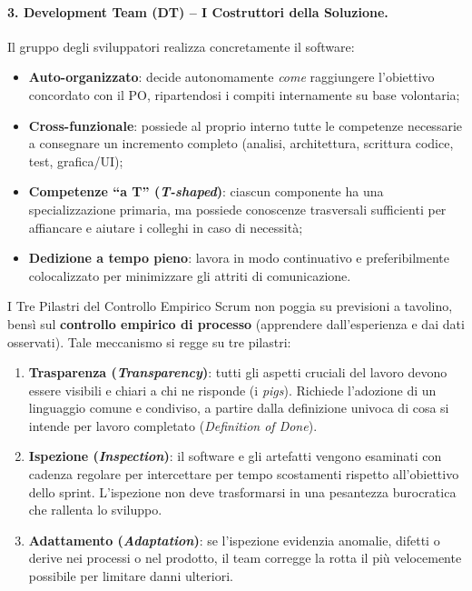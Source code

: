 \documentclass[12pt]{extarticle}
\begin{document}
\paragraph{3. Development Team (DT) -- I Costruttori della Soluzione.}
Il gruppo degli sviluppatori realizza concretamente il software:
\begin{itemize}
    \item \textbf{Auto-organizzato}: decide autonomamente \textit{come} raggiungere l'obiettivo concordato con il PO, ripartendosi i compiti internamente su base volontaria;
    \item \textbf{Cross-funzionale}: possiede al proprio interno tutte le competenze necessarie a consegnare un incremento completo (analisi, architettura, scrittura codice, test, grafica/UI);
    \item \textbf{Competenze ``a T'' (\textit{T-shaped})}: ciascun componente ha una specializzazione primaria, ma possiede conoscenze trasversali sufficienti per affiancare e aiutare i colleghi in caso di necessità;
    \item \textbf{Dedizione a tempo pieno}: lavora in modo continuativo e preferibilmente colocalizzato per minimizzare gli attriti di comunicazione.
\end{itemize}

\begin{cbox}{I Tre Pilastri del Controllo Empirico}
\noindent Scrum non poggia su previsioni a tavolino, bensì sul \textbf{controllo empirico di processo} (apprendere dall'esperienza e dai dati osservati). Tale meccanismo si regge su tre pilastri:
\begin{enumerate}
    \item \textbf{Trasparenza (\textit{Transparency})}: tutti gli aspetti cruciali del lavoro devono essere visibili e chiari a chi ne risponde (i \textit{pigs}). Richiede l'adozione di un linguaggio comune e condiviso, a partire dalla definizione univoca di cosa si intende per lavoro completato (\textit{Definition of Done}).
    \item \textbf{Ispezione (\textit{Inspection})}: il software e gli artefatti vengono esaminati con cadenza regolare per intercettare per tempo scostamenti rispetto all'obiettivo dello sprint. L'ispezione non deve trasformarsi in una pesantezza burocratica che rallenta lo sviluppo.
    \item \textbf{Adattamento (\textit{Adaptation})}: se l'ispezione evidenzia anomalie, difetti o derive nei processi o nel prodotto, il team corregge la rotta il più velocemente possibile per limitare danni ulteriori.
\end{enumerate}
\end{cbox}
\end{document}
